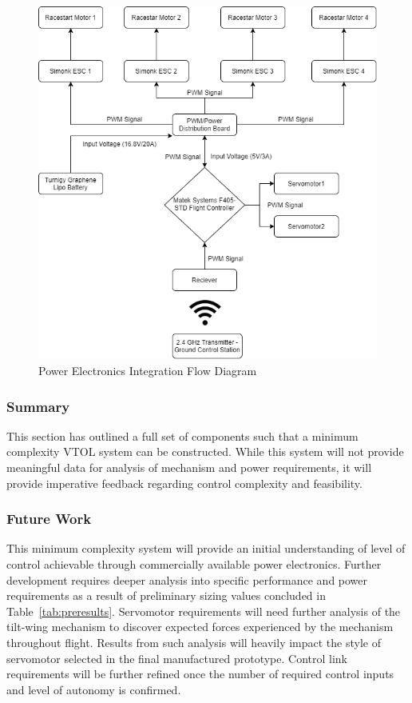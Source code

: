 \begin{figure}[H]
    \centering
    \includegraphics[width=\textwidth]{powerElectronics/systemarchitecture.png}
    \caption{Power Electronics Integration Flow Diagram}
    \label{fig:powerElectronicsFlow}
\end{figure}
\clearpage

\subsubsection{Summary}
This section has outlined a full set of components such that a minimum complexity VTOL system can be constructed. While this system will not provide meaningful data for analysis of mechanism and power requirements, it will provide imperative feedback regarding control complexity and feasibility.
\subsubsection{Future Work}
This minimum complexity system will provide an initial understanding of level of control achievable through commercially available power electronics. Further development requires deeper analysis into specific performance and power requirements as a result of preliminary sizing values concluded in Table~\ref{tab:preresults}. Servomotor requirements will need further analysis of the tilt-wing mechanism to discover expected forces experienced by the mechanism throughout flight. Results from such analysis will heavily impact the style of servomotor selected in the final manufactured prototype. Control link requirements will be further refined once the number of required control inputs and level of autonomy is confirmed.